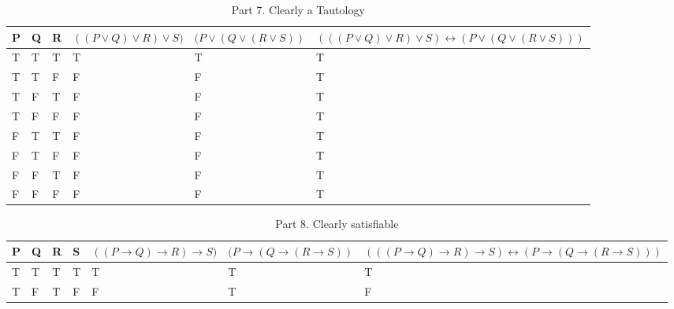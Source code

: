 \documentclass[10.5pt]{article}
\newenvironment{solution}[2][Solution]{ \begin{trivlist}
\item[\hskip \labelsep {\bfseries #1}]}{\end{trivlist}}
\begin{document}
\begin{solution}{2}
\begin{table}[!h]
\centering
\caption{Part 7. Clearly a Tautology}
\label{my-label}
\begin{tabular}{|l|l|l|l|l|l|}
\hline
P & Q & R & $((P \vee Q) \vee R) \vee S)$ & $(P \vee (Q \vee (R \vee S))$ & $(((P \vee Q) \vee R) \vee S) \leftrightarrow (P \vee (Q \vee (R \vee S)))$ \\ \hline
T & T & T & T & T & T \\ \hline
T & T & F & F & F & T \\ \hline
T & F & T & F & F & T \\ \hline
T & F & F & F & F & T \\ \hline
F & T & T & F & F & T \\ \hline
F & T & F & F & F & T \\ \hline
F & F & T & F & F & T \\ \hline
F & F & F & F & F & T \\ \hline
\end{tabular}
\end{table}

\pagebreak

\begin{table}[!h]
\centering
\caption{Part 8. Clearly satisfiable}
\label{my-label}
\begin{tabular}{|l|l|l|l|l|l|l|}
\hline
P & Q & R & S & $((P \rightarrow Q) \rightarrow R) \rightarrow S)$ & $(P \rightarrow (Q \rightarrow (R \rightarrow S))$ & $(((P \rightarrow Q) \rightarrow R) \rightarrow S) \leftrightarrow (P \rightarrow (Q \rightarrow (R \rightarrow S)))$ \\ \hline
T & T & T & T & T & T & T \\ \hline
T & F & T & F & F & T & F \\ \hline
\end{tabular}
\end{table}


\end{solution}
\end{document}
